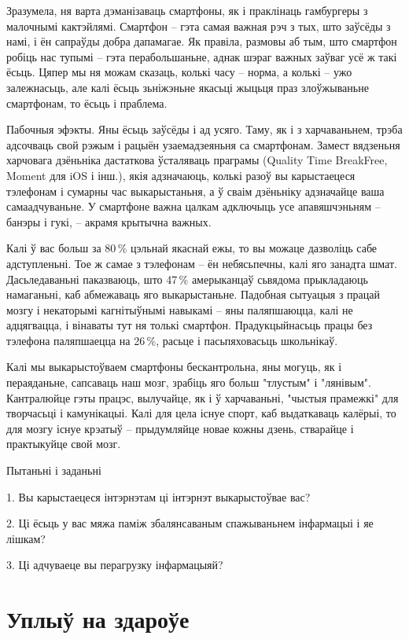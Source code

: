 Зразумела, ня варта дэманізаваць смартфоны, як і праклінаць гамбургеры з малочнымі кактэйлямі. Смартфон – гэта самая важная рэч з тых, што заўсёды з намі, і ён сапраўды добра дапамагае. Як правіла, размовы аб тым, што смартфон робіць нас тупымі – гэта перабольшаньне, аднак шэраг важных заўваг усё ж такі ёсьць. Цяпер мы ня можам сказаць, колькі часу – норма, а колькі – ужо залежнасьць, але калі ёсьць зьніжэньне якасьці жыцьця праз злоўжываньне смартфонам, то ёсьць і праблема.

Пабочныя эфэкты. Яны ёсьць заўсёды і ад усяго. Таму, як і з харчаваньнем, трэба адсочваць свой рэжым і рацыён узаемадзеяньня са смартфонам. Замест вядзеньня харчовага дзёньніка дастаткова ўсталяваць праграмы (Quality Time BreakFree, Moment для iOS і інш.), якія адзначаюць, колькі разоў вы карыстаецеся тэлефонам і сумарны час выкарыстаньня, а ў сваім дзёньніку адзначайце ваша самаадчуваньне. У смартфоне важна цалкам адключыць усе апавяшчэньням – банэры і гукі, – акрамя крытычна важных. 

Калі ў вас больш за 80\,\% цэльнай якаснай ежы, то вы можаце дазволіць сабе адступленьні. Тое ж самае з тэлефонам – ён небясьпечны, калі яго занадта шмат. Дасьледаваньні паказваюць, што 47\,\% амерыканцаў сьвядома прыкладаюць намаганьні, каб абмежаваць яго выкарыстаньне. Падобная сытуацыя з працай мозгу і некаторымі кагнітыўнымі навыкамі – яны паляпшаюцца, калі не адцягвацца, і вінаваты тут ня толькі смартфон. Прадукцыйнасьць працы без тэлефона паляпшаецца на 26\,\%, расьце і пасьпяховасьць школьнікаў.

Калі мы выкарыстоўваем смартфоны бескантрольна, яны могуць, як і пераяданьне, сапсаваць наш мозг, зрабіць яго больш "тлустым" і "лянівым". Кантралюйце гэты працэс, вылучайце, як і ў харчаваньні, "чыстыя прамежкі" для творчасьці і камунікацыі. Калі для цела існуе спорт, каб выдаткаваць калёрыі, то для мозгу існуе крэатыў – прыдумляйце новае кожны дзень, стварайце і практыкуйце свой мозг.

Пытаньні і заданьні

1. Вы карыстаецеся інтэрнэтам ці інтэрнэт выкарыстоўвае вас?

2. Ці ёсьць у вас мяжа паміж збалянсаваным спажываньнем інфармацыі і яе лішкам?

3. Ці адчуваеце вы перагрузку інфармацыяй?


\section{Уплыў на здароўе}

